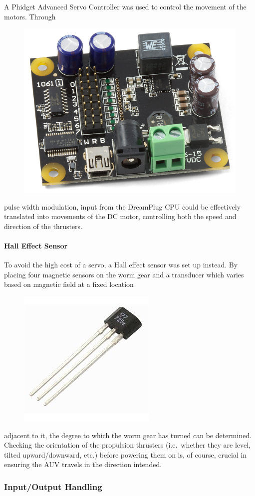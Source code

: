 \documentclass[12pt, letterpaper, twocolumn, titlepage]{article}
\begin{document}
A Phidget Advanced Servo Controller was used to control the movement of the motors. Through
\begin{figure}
	\vspace{-30pt}
 	\flushright
   	\includegraphics[width=0.4\columnwidth]{ServoController}
   	\vspace{-30pt}
\end{figure}
pulse width modulation, input from the DreamPlug CPU could be effectively translated into movements of the DC motor, controlling both the speed and direction of the thrusters.

\paragraph{Hall Effect Sensor}

To avoid the high cost of a servo, a Hall effect sensor was set up instead. By placing four magnetic sensors on the worm gear and a transducer which varies based on magnetic field at a fixed location
\begin{figure}
	\vspace{-30pt}
 	\flushright
   	\includegraphics[width=0.3\columnwidth]{HallEffect}
   	\vspace{-30pt}
\end{figure}
adjacent to it, the degree to which the worm gear has turned can be determined. Checking the orientation of the propulsion thrusters (i.e.~whether they are level, tilted upward/downward, etc.) before powering them on is, of course, crucial in ensuring the AUV travels in the direction intended.

\subsubsection{Input/Output Handling}
\end{document}
